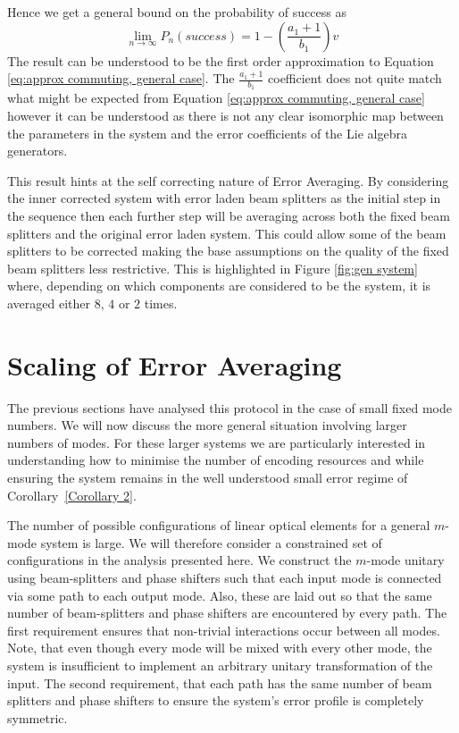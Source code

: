 \documentclass[aps,pra,twocolumn,superscriptaddress,numerical,floatfix]{revtex4-1}
\begin{document}
Hence we get a general bound on the probability of success as
\begin{equation}
\lim_{n\rightarrow\infty}P_{n}\left(success\right)=1-\left(\frac{a_{1}+1}{b_{1}}\right)v\label{eq:PsuccessGeneral}
\end{equation}
The result can be understood to be the first order approximation to Equation \ref{eq:approx commuting, general case}. The $\frac{a_1+1}{b_1}$ coefficient does not quite match what might be expected from Equation \ref{eq:approx commuting, general case} however it can be understood as there is not any clear isomorphic map between the parameters in the system and the error coefficients of the Lie algebra generators.

This result hints at the self correcting nature of Error Averaging. By considering the inner corrected system with error laden beam splitters as the initial step in the sequence then each further step will be averaging across both the fixed beam splitters and the original error laden system. This could allow some of the beam splitters to be corrected  making the base assumptions on the quality of the fixed beam splitters less restrictive. This is highlighted in Figure \ref{fig:gen system} where, depending on which components are considered to be the system, it is averaged either $8$, $4$ or $2$ times. 

\section{Scaling of Error Averaging\label{Feasibility section}}

The previous sections have analysed this protocol in the case of small fixed mode numbers.  We will now discuss the more general situation involving larger numbers of modes.  For these larger systems we are particularly interested in understanding how to minimise the number of encoding resources and while ensuring the system remains in the well understood small error regime of Corollary~\ref{Corollary 2}.

The number of possible configurations of linear optical elements for a general $m$-mode system is large.  We will therefore consider a constrained set of configurations in the analysis presented here.   We construct the $m$-mode unitary using beam-splitters and phase shifters such that each input mode is connected via some path to each output mode.  Also, these are laid out so that the same number of beam-splitters and phase shifters are encountered by every path. The first requirement ensures that non-trivial interactions occur between all modes.  Note, that even though every mode will be mixed with every other mode, the system is insufficient to implement an arbitrary unitary transformation of the input. The second requirement, that each path has the same number of beam splitters and phase shifters to ensure the system's error profile is completely symmetric.
\end{document}
